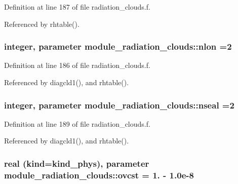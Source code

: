 Definition at line 187 of file radiation\+\_\+clouds.\+f.



Referenced by rhtable().

\subsubsection[{\texorpdfstring{nlon}{nlon}}]{\setlength{\rightskip}{0pt plus 5cm}integer, parameter module\+\_\+radiation\+\_\+clouds\+::nlon =2\hspace{0.3cm}{\ttfamily [private]}}\hypertarget{namespacemodule__radiation__clouds_ab4d14edea12bbcda5361cad523386c7c}{}\label{namespacemodule__radiation__clouds_ab4d14edea12bbcda5361cad523386c7c}


Definition at line 186 of file radiation\+\_\+clouds.\+f.



Referenced by diagcld1(), and rhtable().

\subsubsection[{\texorpdfstring{nseal}{nseal}}]{\setlength{\rightskip}{0pt plus 5cm}integer, parameter module\+\_\+radiation\+\_\+clouds\+::nseal =2\hspace{0.3cm}{\ttfamily [private]}}\hypertarget{namespacemodule__radiation__clouds_aaf2a6549a8c42b9eae3d40d21d1e9532}{}\label{namespacemodule__radiation__clouds_aaf2a6549a8c42b9eae3d40d21d1e9532}


Definition at line 189 of file radiation\+\_\+clouds.\+f.



Referenced by diagcld1(), and rhtable().

\subsubsection[{\texorpdfstring{ovcst}{ovcst}}]{\setlength{\rightskip}{0pt plus 5cm}real (kind=kind\+\_\+phys), parameter module\+\_\+radiation\+\_\+clouds\+::ovcst = 1. -\/ 1.\+0e-\/8\hspace{0.3cm}{\ttfamily [private]}}\hypertarget{namespacemodule__radiation__clouds_a5667082e13ef37593bdfcc152e3dd449}{}\label{namespacemodule__radiation__clouds_a5667082e13ef37593bdfcc152e3dd449}


